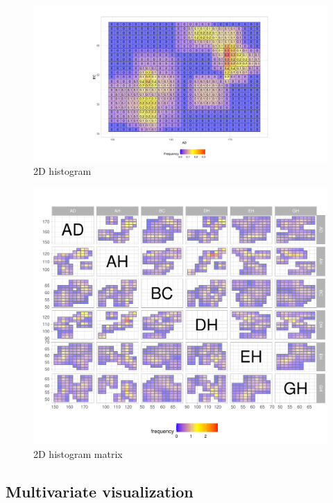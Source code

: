 \documentclass[article]{jss}
\begin{document}
\begin{figure}[htbp]
\centering
\includegraphics[width=1\textwidth]{ggESDA_Jiang&Wu_20210915-2Dhist.pdf
}
\caption{\label{fig:2Dhist} 2D histogram }
\end{figure}


\begin{figure}[htbp]
\centering
\includegraphics[]{ggESDA_Jiang&Wu_20210915-2DhistMatrix.pdf
}
\caption{\label{fig:2DhistMatrix} 2D histogram matrix}
\end{figure}


\subsection{Multivariate visualization}
\end{document}
